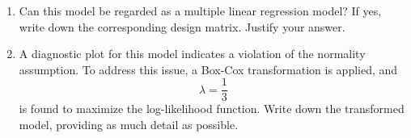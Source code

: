 \begin{enumerate}
\item[(a)] Can this model be regarded as a multiple linear regression model? If yes, write down the corresponding design matrix. Justify your answer.

\vspace{4cm}

\item[(b)] A diagnostic plot for this model indicates a violation of the normality assumption. To address this issue, a Box-Cox transformation is applied, and
\[
\lambda = \frac{1}{3}
\]
is found to maximize the log-likelihood function. Write down the transformed model, providing as much detail as possible.

\vspace{4cm}

\end{enumerate}

\clearpage
